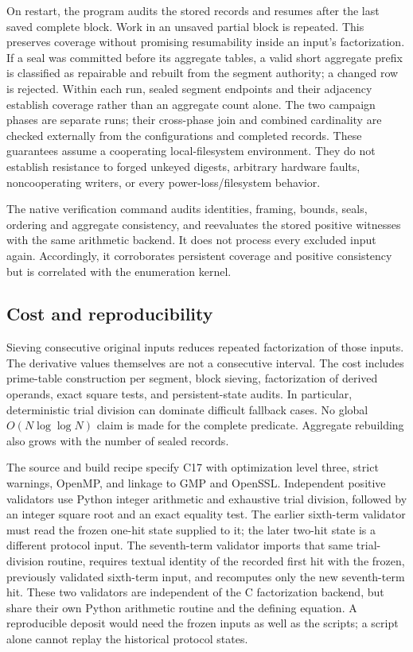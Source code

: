 \documentclass[11pt,a4paper]{article}
\theoremstyle{remark}
\begin{document}
On restart, the program audits the stored records and resumes after the last
saved complete block. Work in an unsaved partial block is repeated. This
preserves coverage without promising resumability inside an input's
factorization. If a seal was committed before its aggregate tables, a valid
short aggregate prefix is classified as repairable and rebuilt from the
segment authority; a changed row is rejected. Within each run, sealed segment
endpoints and their adjacency establish coverage rather than an aggregate
count alone. The two campaign phases are separate runs; their cross-phase
join and combined cardinality are checked externally from the configurations
and completed records. These guarantees assume a cooperating local-filesystem environment.
They do not establish resistance to forged unkeyed digests, arbitrary hardware
faults, noncooperating writers, or every power-loss/filesystem behavior.

The native verification command audits identities, framing, bounds, seals,
ordering and aggregate consistency, and reevaluates the stored positive
witnesses with the same arithmetic backend. It does not process every
excluded input again. Accordingly, it corroborates persistent coverage and
positive consistency but is correlated with the enumeration kernel.

\subsection{Cost and reproducibility}
Sieving consecutive original inputs reduces repeated factorization of those
inputs. The derivative values themselves are not a consecutive interval.
The cost includes prime-table construction per segment, block sieving,
factorization of derived operands, exact square tests, and persistent-state
audits. In particular, deterministic trial division can dominate difficult
fallback cases. No global $O(N\log\log N)$ claim is made for the complete
predicate. Aggregate rebuilding also grows with the number of sealed records.

The source and build recipe specify C17 with optimization level three,
strict warnings, OpenMP, and linkage to GMP and OpenSSL. Independent positive
validators use Python integer arithmetic and exhaustive trial division,
followed by an integer square root and an exact equality test. The earlier
sixth-term validator must read the frozen one-hit state supplied to it;
the later two-hit state is a different protocol input. The seventh-term
validator imports that same trial-division routine, requires textual identity
of the recorded first hit with the frozen, previously validated sixth-term
input, and recomputes only the new seventh-term hit. These two validators are
independent of the C factorization backend, but share their own Python
arithmetic routine and the defining equation. A reproducible deposit would
need the frozen inputs as well as the scripts; a script alone cannot replay
the historical protocol states.
\end{document}
